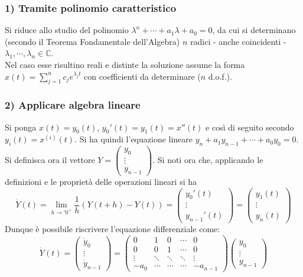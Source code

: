 \documentclass[10pt, oneside]{book}
\theoremstyle{plain}
\begin{document}
\subsubsection{1) Tramite polinomio caratteristico}
Si riduce allo studio del polinomio $\lambda^n + \cdots + a_1\lambda + a_0 = 0$, da cui si determinano (secondo il Teorema Fondamentale dell'Algebra) $n$ radici - anche coincidenti - $\lambda_1, \cdots, \lambda_n \in \mathbb{C}$.
\\Nel caso esse risultino reali e distinte la soluzione assume la forma $\displaystyle x(t) = \sum\limits_{j=1}^n c_j e^{\lambda_j t}$ con coefficienti da determinare ($n$ d.o.f.).

\subsubsection{2) Applicare algebra lineare}
Si ponga $x(t) = y_0(t)$, $y_0'(t) = y_1(t) = x''(t)$ e così di seguito secondo $y_i(t) = x^{(i)}(t)$. Si ha quindi l'equazione lineare $y_n + a_1 y_{n-1} + \cdots + a_0 y_0 = 0$.
\\Si definisca ora il vettore $\displaystyle Y = \begin{pmatrix} 
y_0\\ \vdots \\y_{n-1}
\end{pmatrix}$. Si noti ora che, applicando le definizioni e le proprietà delle operazioni lineari si ha 
\[\dot{Y}(t) = \lim\limits_{h \rightarrow '0^+} \frac{1}{h}(Y(t+h) - Y(t)) = \begin{pmatrix}
    y_0'(t)\\ \vdots \\ y_{n-1}'(t)
\end{pmatrix} = \begin{pmatrix}
    y_1(t) \\ \vdots \\ y_n(t)
\end{pmatrix}\]
Dunque è possibile riscrivere l'equazione differenziale come:
\[\dot{Y}(t) = \begin{pmatrix}
        \dot{y}_0\\ \vdots \\ \dot{y}_{n-1}
\end{pmatrix} = \begin{pmatrix}
    0 & 1 & 0 & \cdots & 0\\
    0 & 0 & 1 & \cdots & 0\\
    \vdots & \ddots & \ddots & \ddots & \vdots\\
    -a_0 & \cdots & \cdots & \cdots & - a_{n-1}
\end{pmatrix} \begin{pmatrix}
    y_0\\ \vdots \\ y_{n-1}
\end{pmatrix}\]
\end{document}
